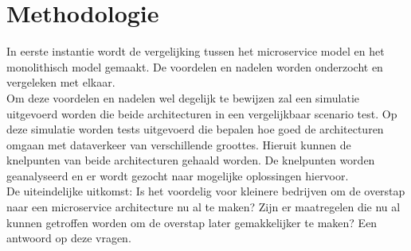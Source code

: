 \chapter{Methodologie}
\label{ch:methodologie}

In eerste instantie wordt de vergelijking tussen het microservice model en het monolithisch model gemaakt. De voordelen en nadelen worden onderzocht en vergeleken met elkaar.
\\
Om deze voordelen en nadelen wel degelijk te bewijzen zal een simulatie uitgevoerd worden die beide architecturen in een vergelijkbaar scenario test. Op deze simulatie worden tests uitgevoerd die bepalen hoe goed de architecturen omgaan met dataverkeer van verschillende groottes. Hieruit kunnen de knelpunten van beide architecturen gehaald worden.
De knelpunten worden geanalyseerd en er wordt gezocht naar mogelijke oplossingen hiervoor.
\\
De uiteindelijke uitkomst: Is het voordelig voor kleinere bedrijven om de overstap naar een microservice architecture nu al te maken? Zijn er maatregelen die nu al kunnen getroffen worden om de overstap later gemakkelijker te maken? Een antwoord op deze vragen.
